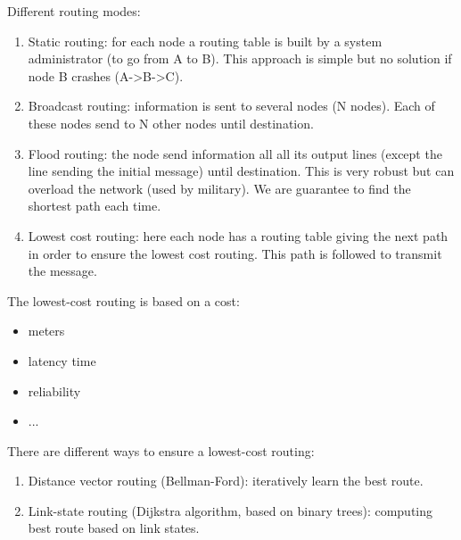 \documentclass{beamer}[10pt, usepdftitle=false, handout]
\begin{document}
	\begin{frame}
	
	Different routing modes:
	\vspace*{0.5em}
	
	\begin{enumerate}
	\item{Static routing: for each node a routing table is built by a system administrator (to go from A to B). This approach is simple but no solution if node B crashes (A->B->C).}
	\item{Broadcast routing: information is sent to several nodes (N nodes). Each of these nodes send to N other nodes until destination.}
	\item{Flood routing: the node send information all all its output lines (except the line sending the initial message) until destination. This is very robust but can overload the network (used by military). We are guarantee to find the shortest path each time.}
	\item{Lowest cost routing: here each node has a routing table giving the next path in order to ensure the lowest cost routing. This path is followed to transmit the message.}	
	\end{enumerate}			
	
	
	\end{frame}
	
	\begin{frame}	
	
	The lowest-cost routing is based on a cost:
	\vspace*{0.5em}
	
	\begin{itemize}
	\item{meters}
	\item{latency time}
	\item{reliability}
	\item{...}	
	\end{itemize}		
	\vspace*{1em}		
		
	There are different ways to ensure a lowest-cost routing:
	\vspace*{0.5em}
	
	\begin{enumerate}
	\item{Distance vector routing (Bellman-Ford): iteratively learn the best route.}
	\item{Link-state routing (Dijkstra algorithm, based on binary trees): computing best route based on link states.}		
	\end{enumerate}			
		
	\end{frame}
	
\end{document}
